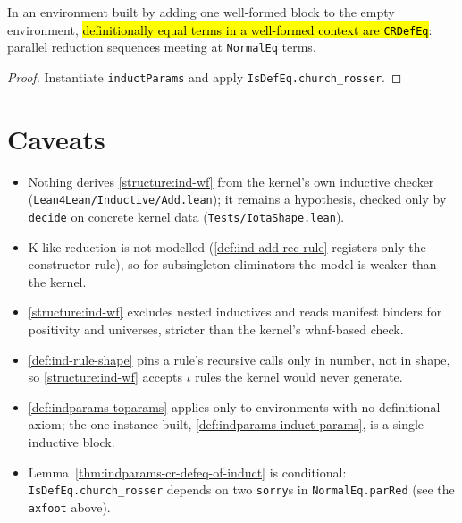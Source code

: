 \begin{lemma}
\label{thm:indparams-cr-defeq-of-induct}
\leanok
{} 

 In an environment built by adding one well-formed block to the empty
environment, \hl{definitionally equal terms in a well-formed context are \texttt{CRDefEq}}:
parallel reduction sequences meeting at \texttt{NormalEq} terms.
\end{lemma}
\begin{proof}
\leanok
{} Instantiate \texttt{inductParams} and apply \texttt{IsDefEq.church\_rosser}.
\end{proof}

\section*{Caveats}
\label{sec:ind-review}

\begin{itemize}
\item Nothing derives \ref{structure:ind-wf} from the kernel's own inductive checker
(\texttt{Lean4Lean/Inductive/Add.lean}); it remains a hypothesis, checked only by
\texttt{decide} on concrete kernel data (\texttt{Tests/IotaShape.lean}).
\item K-like reduction is not modelled (\ref{def:ind-add-rec-rule} registers only the
constructor rule), so for subsingleton eliminators the model is weaker than the kernel.
\item \ref{structure:ind-wf} excludes nested inductives and reads manifest binders for
positivity and universes, stricter than the kernel's whnf-based check.
\item \ref{def:ind-rule-shape} pins a rule's recursive calls only in number, not in shape, so
\ref{structure:ind-wf} accepts $\iota$ rules the kernel would never generate.
\item \ref{def:indparams-toparams} applies only to environments with no definitional axiom;
the one instance built, \ref{def:indparams-induct-params}, is a single inductive block.
\item Lemma~\ref{thm:indparams-cr-defeq-of-induct} is conditional: \texttt{IsDefEq.church\_rosser}
depends on two \texttt{sorry}s in \texttt{NormalEq.parRed} (see the \texttt{axfoot} above).
\end{itemize}
